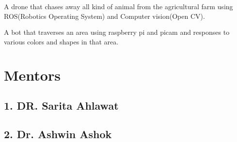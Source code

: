 \documentclass[]{deedy-resume-openfont}
\begin{document}
\begin{minipage}[t]{0.60\textwidth}
A drone that chases away all kind of animal from the agricultural farm using ROS(Robotics Operating System) and Computer vision(Open CV).
\sectionsep

A bot that traverses an area using raspberry pi and picam and responses to various colors and shapes in that area.
\sectionsep


\hline
\section{Mentors}
\subsection{1. DR. Sarita Ahlawat}
\sectionsep
\subsection{2. Dr. Ashwin Ashok}
\end{minipage}
\end{document}

